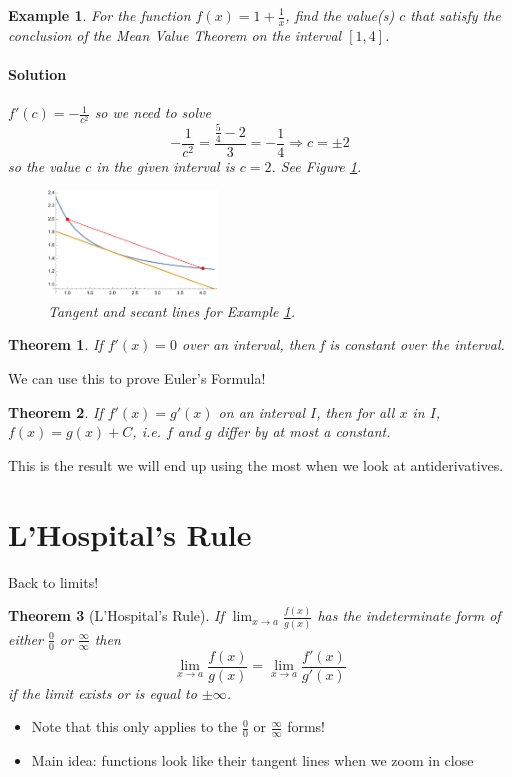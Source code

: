 \documentclass[letterpaper, 11pt, openany]{book}
\theoremstyle{mytheoremstyle}
\newtheorem{theorem}{Theorem}[section]
\theoremstyle{myexamplestyle}
\newtheorem{example}{Example}[section]
\newenvironment{solution}{\paragraph{\sffamily \smaller \fontseries{b}\selectfont Solution}}{\hfill\faSquare}
\begin{document}
\begin{example}\label{e:mvt}
    For the function \(f(x) = 1 + \frac{1}{x}\), find the value(s) \(c\) that satisfy the conclusion of the Mean Value Theorem on the interval \([1,4]\).

    \begin{solution}
        \(f'(c) = -\frac{1}{c^2}\) so we need to solve
        \[-\frac{1}{c^2} = \frac{\frac{5}{4} - 2}{3} = -\frac{1}{4} \Rightarrow c = \pm 2\]
        so the value \(c\) in the given interval is \(c = 2\). See Figure \ref{f:mvt-graph}.
    \end{solution}

    \begin{figure}[htbp]
        \centering
            \includegraphics[width=0.4\textwidth]{Figures/mvt-graph.pdf}
        \caption{Tangent and secant lines for Example \ref{e:mvt}.}
        \label{f:mvt-graph}
    \end{figure}
\end{example}


\begin{theorem}\label{t:mvt-const-f}
    If \(f'(x) = 0\) over an interval, then f is constant over the interval.
\end{theorem}

We can use this to prove Euler's Formula!

\begin{theorem}\label{t:mvt-same-deriv}
    If \(f'(x) = g'(x)\) on an interval \(I\), then for all \(x\) in \(I\), \(f(x) = g(x) + C\), i.e. \(f\) and \(g\) differ by at most a constant.
\end{theorem}

This is the result we will end up using the most when we look at antiderivatives.

\section{L'Hospital's Rule}

Back to limits!

\begin{theorem}[L'Hospital's Rule]
    If \(\lim_{x \to a} \frac{f(x)}{g(x)}\) has the indeterminate form of either \(\frac{0}{0}\) or \(\frac{\infty}{\infty}\) then 
    \[\lim_{x \to a} \frac{f(x)}{g(x)} = \lim_{x \to a} \frac{f'(x)}{g'(x)}\]
    if the limit exists or is equal to \(\pm \infty\).
\end{theorem}
\begin{itemize}
    \item[{\faExclamationTriangle[solid]}] Note that this only applies to the \( \frac{0}{0}\) or \(\frac{\infty}{\infty}\) forms!
    \item  Main idea: functions look like their tangent lines when we zoom in close
\end{itemize}
\end{document}
